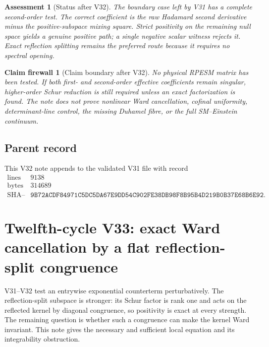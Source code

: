 \documentclass[11pt]{article}
\newtheorem{firewall}[theorem]{Claim firewall}
\newtheorem{assessment}[theorem]{Assessment}
\theoremstyle{remark}
\begin{document}
\begin{assessment}[Status after V32]
\label{ass:v12v32-status}
The boundary case left by V31 has a complete second-order test.
The correct coefficient is the raw Hadamard second derivative minus
the positive-subspace mixing square.  Strict positivity on the
remaining null space yields a genuine positive path; a single
negative scalar witness rejects it.  Exact reflection splitting
remains the preferred route because it requires no spectral opening.
\end{assessment}

\begin{firewall}[Claim boundary after V32]
\label{fire:v12v32-claim}
No physical RPESM matrix has been tested.  If both first- and
second-order effective coefficients remain singular, higher-order
Schur reduction is still required unless an exact factorization is
found.  The note does not prove nonlinear Ward cancellation,
cofinal uniformity, determinant-line control, the missing Duhamel
fibre, or the full SM--Einstein continuum.
\end{firewall}

\subsection{Parent record}

This V32 note appends to the validated V31 file with record
\[
\begin{array}{c|c}
\text{lines}&9138\\
\text{bytes}&314689\\
\text{SHA--256}&
\texttt{9B72ACDF84971C5DC5DA67E9DD54C902FE38DB98F8B95B4D219B0B37E68B6E92}.
\end{array}
\]


\section{Twelfth-cycle V33: exact Ward cancellation by a flat
reflection-split congruence}
\label{sec:v12v33}

V31--V32 test an entrywise exponential counterterm perturbatively.
The reflection-split subspace is stronger: its Schur factor is rank
one and acts on the reflected kernel by diagonal congruence, so
positivity is exact at every strength.  The remaining question is
whether such a congruence can make the kernel Ward invariant.  This
note gives the necessary and sufficient local equation and its
integrability obstruction.
\end{document}
